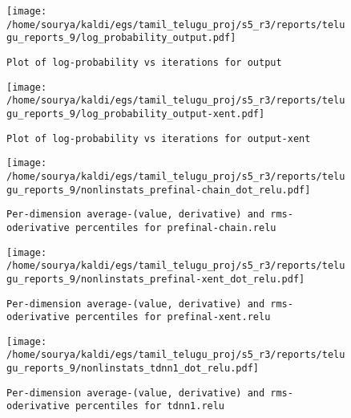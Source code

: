 \documentclass[prl,10pt,twocolumn]{revtex4}
\begin{document}
\newpage
\begin{figure}[h]
  \begin{center}
    \caption{\texttt{Plot of log-probability vs iterations for output}}
    \texttt{[image: /home/sourya/kaldi/egs/tamil\_telugu\_proj/s5\_r3/reports/telugu\_reports\_9/log\_probability\_output.pdf]}
  \end{center}
\end{figure}
\clearpage


\newpage
\begin{figure}[h]
  \begin{center}
    \caption{\texttt{Plot of log-probability vs iterations for output-xent}}
    \texttt{[image: /home/sourya/kaldi/egs/tamil\_telugu\_proj/s5\_r3/reports/telugu\_reports\_9/log\_probability\_output-xent.pdf]}
  \end{center}
\end{figure}
\clearpage


\newpage
\begin{figure}[h]
  \begin{center}
    \caption{\texttt{Per-dimension average-(value, derivative) and rms-oderivative percentiles for prefinal-chain.relu}}
    \texttt{[image: /home/sourya/kaldi/egs/tamil\_telugu\_proj/s5\_r3/reports/telugu\_reports\_9/nonlinstats\_prefinal-chain\_dot\_relu.pdf]}
  \end{center}
\end{figure}
\clearpage


\newpage
\begin{figure}[h]
  \begin{center}
    \caption{\texttt{Per-dimension average-(value, derivative) and rms-oderivative percentiles for prefinal-xent.relu}}
    \texttt{[image: /home/sourya/kaldi/egs/tamil\_telugu\_proj/s5\_r3/reports/telugu\_reports\_9/nonlinstats\_prefinal-xent\_dot\_relu.pdf]}
  \end{center}
\end{figure}
\clearpage


\newpage
\begin{figure}[h]
  \begin{center}
    \caption{\texttt{Per-dimension average-(value, derivative) and rms-oderivative percentiles for tdnn1.relu}}
    \texttt{[image: /home/sourya/kaldi/egs/tamil\_telugu\_proj/s5\_r3/reports/telugu\_reports\_9/nonlinstats\_tdnn1\_dot\_relu.pdf]}
  \end{center}
\end{figure}
\clearpage
\end{document}
